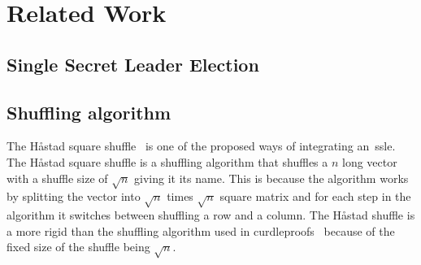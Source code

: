\section{Related Work}\label{sec:related-work}




\subsection{Single Secret Leader Election}\label{sec:related-work-SSLE}




\subsection{Shuffling algorithm}\label{sec:related-work-Shuffling-algorithm}

The Håstad square shuffle~\cite{haastad2006square} is one of the proposed ways of integrating an~\gls{ssle}.
The Håstad square shuffle is a shuffling algorithm that shuffles a $n$ long vector with a shuffle size of $\sqrt {n}$ giving it its name.
This is because the algorithm works by splitting the vector into $\sqrt {n}$ times $\sqrt {n}$ square matrix and for each step in the algorithm it switches between shuffling a row and a column.
The Håstad shuffle is a more rigid than the shuffling algorithm used in curdleproofs~\cite{cryptoeprint:2022/560} because of the fixed size of the shuffle being $\sqrt {n}$.




%
%

